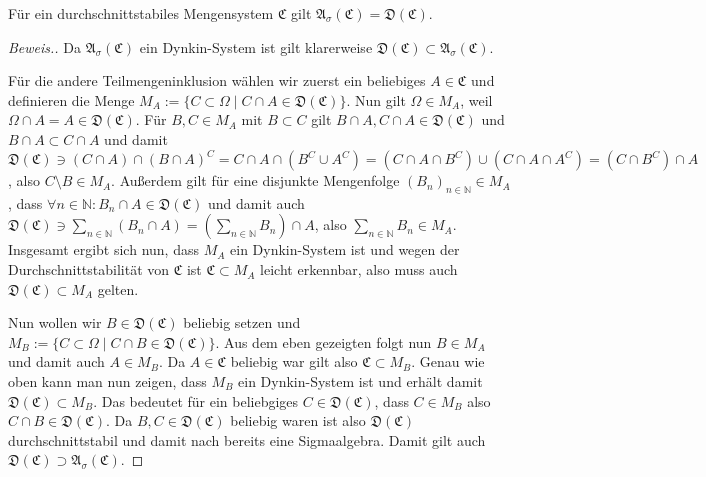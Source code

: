 \begin{lemma}
    Für ein durchschnittstabiles Mengensystem $\mathfrak{C}$ gilt $\mathfrak{A}_\sigma(\mathfrak{C})=\mathfrak{D}(\mathfrak{C})$.
\end{lemma}

\begin{proof}[Beweis.]
    Da $\mathfrak{A}_\sigma(\mathfrak{C})$ ein Dynkin-System ist gilt klarerweise $\mathfrak{D}(\mathfrak{C})\subset \mathfrak{A}_\sigma(\mathfrak{C})$.

    Für die andere Teilmengeninklusion wählen wir zuerst ein beliebiges $A\in\mathfrak{C}$ und definieren die Menge $M_A:=\{C\subset\Omega\mid C\cap A\in\mathfrak{D}(\mathfrak{C})\}$. Nun gilt $\Omega\in M_A$, weil $\Omega\cap A=A\in\mathfrak{D}(\mathfrak{C})$. Für $B,C\in M_A$ mit $B\subset C$ gilt $B\cap A,C\cap A\in\mathfrak{D}(\mathfrak{C})$ und $B\cap A\subset C\cap A$ und damit $\mathfrak{D}(\mathfrak{C})\ni(C\cap A)\cap(B\cap A)^C=C\cap A\cap(B^C\cup A^C)=(C\cap A\cap B^C)\cup(C\cap A\cap A^C)=(C\cap B^C)\cap A$, also $C\setminus B\in M_A$. Außerdem gilt für eine disjunkte Mengenfolge $(B_n)_{n\in\mathbb{N}}\in M_A$, dass $\forall n\in\mathbb{N}:B_n\cap A\in\mathfrak{D}(\mathfrak{C})$ und damit auch $\mathfrak{D}(\mathfrak{C})\ni\sum_{n\in\mathbb{N}}\left(B_n\cap A\right)=\left(\sum_{n\in\mathbb{N}}B_n\right)\cap A$, also $\sum_{n\in\mathbb{N}}B_n\in M_A$. Insgesamt ergibt sich nun, dass $M_A$ ein Dynkin-System ist und wegen der Durchschnittstabilität von $\mathfrak{C}$ ist $\mathfrak{C}\subset M_A$ leicht erkennbar, also muss auch $\mathfrak{D}(\mathfrak{C})\subset M_A$ gelten. 
    
    Nun wollen wir $B\in\mathfrak{D}(\mathfrak{C})$ beliebig setzen und $M_B:=\{C\subset\Omega\mid C\cap B\in\mathfrak{D}(\mathfrak{C})\}$. Aus dem eben gezeigten folgt nun $B\in M_A$ und damit auch $A\in M_B$. Da $A\in\mathfrak{C}$ beliebig war gilt also $\mathfrak{C}\subset M_B$. Genau wie oben kann man nun zeigen, dass $M_B$ ein Dynkin-System ist und erhält damit $\mathfrak{D}(\mathfrak{C})\subset M_B$. Das bedeutet für ein beliebgiges $C\in\mathfrak{D}(\mathfrak{C})$, dass $C\in M_B$ also $C\cap B \in\mathfrak{D}(\mathfrak{C})$. Da $B,C\in\mathfrak{D}(\mathfrak{C})$ beliebig waren ist also $\mathfrak{D}(\mathfrak{C})$ durchschnittstabil und damit nach \cite[Satz 2.75]{zbMATH06257850} bereits eine Sigmaalgebra. Damit gilt auch $\mathfrak{D}(\mathfrak{C})\supset \mathfrak{A}_\sigma(\mathfrak{C})$.
\end{proof}